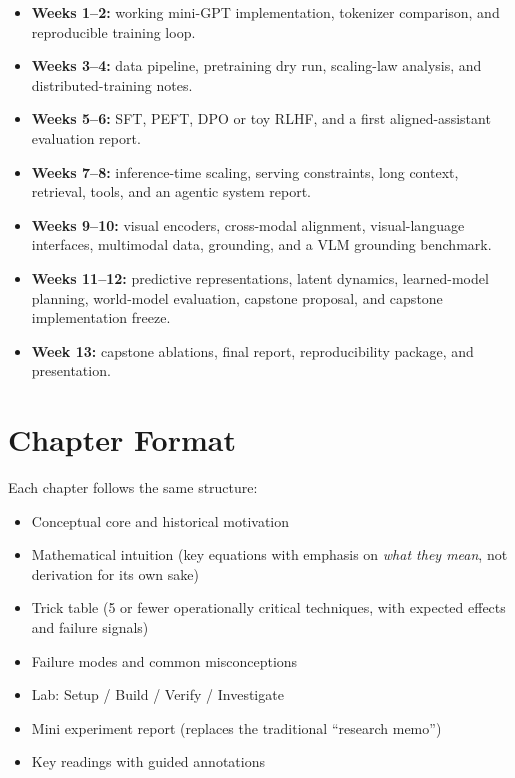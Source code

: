 \begin{itemize}
    \item \textbf{Weeks 1--2:} working mini-GPT implementation, tokenizer comparison, and reproducible training loop.
    \item \textbf{Weeks 3--4:} data pipeline, pretraining dry run, scaling-law analysis, and distributed-training notes.
    \item \textbf{Weeks 5--6:} SFT, PEFT, DPO or toy RLHF, and a first aligned-assistant evaluation report.
    \item \textbf{Weeks 7--8:} inference-time scaling, serving constraints, long context, retrieval, tools, and an agentic system report.
    \item \textbf{Weeks 9--10:} visual encoders, cross-modal alignment, visual-language interfaces, multimodal data, grounding, and a VLM grounding benchmark.
    \item \textbf{Weeks 11--12:} predictive representations, latent dynamics, learned-model planning, world-model evaluation, capstone proposal, and capstone implementation freeze.
    \item \textbf{Week 13:} capstone ablations, final report, reproducibility package, and presentation.
\end{itemize}

\chapter*{Chapter Format}

Each chapter follows the same structure:

\begin{itemize}
    \item Conceptual core and historical motivation
    \item Mathematical intuition (key equations with emphasis on \emph{what they mean}, not derivation for its own sake)
    \item Trick table (5 or fewer operationally critical techniques, with expected effects and failure signals)
    \item Failure modes and common misconceptions
    \item Lab: Setup / Build / Verify / Investigate
    \item Mini experiment report (replaces the traditional ``research memo'')
    \item Key readings with guided annotations
\end{itemize}

